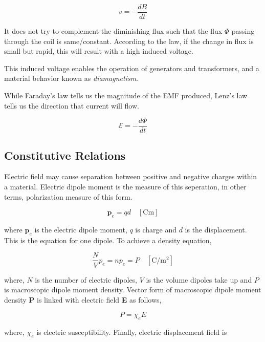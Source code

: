 \begin{equation}
	v=-\frac{dB}{dt}
\end{equation}


It does not try to complement the diminishing flux such that the flux $\Phi$ passing through the coil is same/constant. According to the law, if the change in flux is small but rapid, this will result with a high induced voltage.

This induced voltage enables the operation of generators and transformers, and a material behavior known as \textit{diamagnetism}.

While Faraday's law tells us the magnitude of the EMF produced, Lenz's law tells us the direction that current will flow.

\begin{equation}
	\mathcal{E}=-\frac{d\Phi}{dt}
\end{equation}



\subsection{Constitutive Relations}

Electric field may cause separation between positive and negative charges within a material. Electric dipole moment is the measure of this seperation, in other terms, polarization measure of this form.

\begin{equation}
	\textbf{p}_{e} = qd \quad [\mathrm{Cm}]
\end{equation}

where $\textbf{p}_{e}$ is the electric dipole moment, $q$ is charge and $d$ is the displacement. This is the equation for one dipole. To achieve a density equation,

\begin{equation}
	\frac{N}{V}p_{e}=np_{e}=P \quad [\mathrm{C/m^{2}}]
\end{equation}

where, $N$ is the number of electric dipoles, $V$ is the volume dipoles take up and $P$ is macroscopic dipole moment density. Vector form of macroscopic dipole moment density \textbf{P} is linked with electric field \textbf{E} as follows, 

\begin{equation}
	P = \chi_{e} E
\end{equation}

where, $\chi_{e}$ is electric susceptibility. Finally, electric displacement field is


